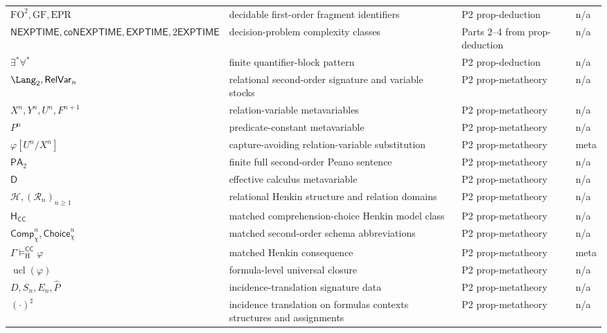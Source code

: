 \begin{longtable}{@{}p{}p{}p{}p{}@{}}
\(\mathrm{FO}^{2},\allowbreak \mathrm{GF},\allowbreak \mathrm{EPR}\) & decidable first-order fragment identifiers & P2 prop-\allowbreak{}deduction & n/a \\
\(\mathsf{NEXPTIME},\allowbreak \mathsf{coNEXPTIME},\allowbreak \mathsf{EXPTIME},\allowbreak 2\mathsf{EXPTIME}\) & decision-problem complexity classes & Parts 2--4 from prop-\allowbreak{}deduction & n/a \\
\(\exists^{*}\forall^{*}\) & finite quantifier-block pattern & P2 prop-\allowbreak{}deduction & n/a \\
\(\Lang_2,\allowbreak \mathsf{RelVar}_n\) & relational second-order signature and variable stocks & P2 prop-\allowbreak{}metatheory & n/a \\
\(X^n,\allowbreak Y^n,\allowbreak U^n,\allowbreak F^{n+1}\) & relation-variable metavariables & P2 prop-\allowbreak{}metatheory & n/a \\
\(P^n\) & predicate-constant metavariable & P2 prop-\allowbreak{}metatheory & n/a \\
\(\varphi[U^n/X^n]\) & capture-avoiding relation-variable substitution & P2 prop-\allowbreak{}metatheory & meta \\
\(\mathsf{PA}_2\) & finite full second-order Peano sentence & P2 prop-\allowbreak{}metatheory & n/a \\
\(\mathsf D\) & effective calculus metavariable & P2 prop-\allowbreak{}metatheory & n/a \\
\(\mathcal H,\allowbreak (\mathcal R_n)_{n\geq1}\) & relational Henkin structure and relation domains & P2 prop-\allowbreak{}metatheory & n/a \\
\(\mathsf H_{\mathsf{CC}}\) & matched comprehension-choice Henkin model class & P2 prop-\allowbreak{}metatheory & n/a \\
\(\mathsf{Comp}_{\chi}^{n},\allowbreak \mathsf{Choice}_{\chi}^{n}\) & matched second-order schema abbreviations & P2 prop-\allowbreak{}metatheory & n/a \\
\(\Gamma\models_{\mathrm H}^{\mathsf{CC}}\varphi\) & matched Henkin consequence & P2 prop-\allowbreak{}metatheory & meta \\
\(\operatorname{ucl}(\varphi)\) & formula-level universal closure & P2 prop-\allowbreak{}metatheory & n/a \\
\(D,\allowbreak S_n,\allowbreak E_n,\allowbreak \widehat P\) & incidence-translation signature data & P2 prop-\allowbreak{}metatheory & n/a \\
\((\cdot)^\sharp\) & incidence translation on formulas contexts structures and assignments & P2 prop-\allowbreak{}metatheory & n/a \\

\end{longtable}
